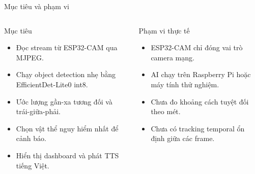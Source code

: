 \documentclass[aspectratio=169]{beamer}
\begin{document}
\begin{frame}{Mục tiêu và phạm vi}
  \begin{columns}[T,onlytextwidth]
    \begin{block}{Mục tiêu}
      \begin{itemize}
        \item Đọc stream từ ESP32-CAM qua MJPEG.
        \item Chạy object detection nhẹ bằng EfficientDet-Lite0 int8.
        \item Ước lượng gần-xa tương đối và trái-giữa-phải.
        \item Chọn vật thể nguy hiểm nhất để cảnh báo.
        \item Hiển thị dashboard và phát TTS tiếng Việt.
      \end{itemize}
    \end{block}
    \begin{block}{Phạm vi thực tế}
      \begin{itemize}
        \item ESP32-CAM chỉ đóng vai trò camera mạng.
        \item AI chạy trên Raspberry Pi hoặc máy tính thử nghiệm.
        \item Chưa đo khoảng cách tuyệt đối theo mét.
        \item Chưa có tracking temporal ổn định giữa các frame.
      \end{itemize}
    \end{block}
  \end{columns}
\end{frame}
\end{document}
